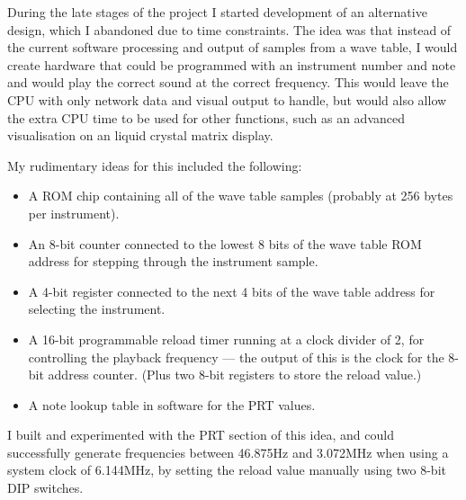 During the late stages of the project I started development of an alternative design, which I 
abandoned due to time constraints.  The idea was that instead of the current software processing and 
output of samples from a wave table, I would create hardware that could be programmed with an 
instrument number and note and would play the correct sound at the correct frequency.   This would 
leave the CPU with only network data and visual output to handle, but would also allow the extra CPU 
time to be used for other functions, such as an advanced visualisation on an liquid crystal matrix 
display.

My rudimentary ideas for this included the following:

\begin{itemize}
\item A ROM chip containing all of the wave table samples (probably at 256 bytes per instrument).
\item An 8-bit counter connected to the lowest 8 bits of the wave table ROM address for stepping 
through the instrument sample.
\item A 4-bit register connected to the next 4 bits of the wave table address for selecting the 
instrument.
\item A 16-bit programmable reload timer running at a clock divider of 2, for controlling the 
playback frequency --- the output of this is the clock for the 8-bit address counter.  (Plus two 
8-bit registers to store the reload value.)
\item A note lookup table in software for the PRT values.
\end{itemize}

I built and experimented with the PRT section of this idea, and could successfully generate 
frequencies between 46.875Hz and 3.072MHz when using a system clock of 6.144MHz, by setting the 
reload value manually using two 8-bit DIP switches.
